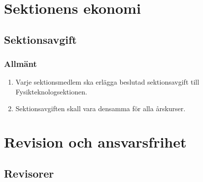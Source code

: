 \documentclass[11pt,a4paper]{article}
\begin{document}
\newpage



\section{Sektionens ekonomi}
\subsection{Sektionsavgift}

\subsubsection{Allmänt}

\begin{enumerate}[\thesubsection .1]

  \item Varje sektionsmedlem ska erlägga beslutad sektionsavgift till
  Fysikteknologsektionen.

  \item Sektionsavgiften skall vara densamma för alla årskurser.

\end{enumerate}

\newpage




\section{Revision och ansvarsfrihet}

\subsection{Revisorer}
\end{document}
